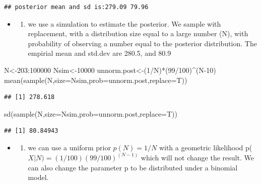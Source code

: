 \documentclass[
]{book}
\newenvironment{Shaded}{\begin{snugshade}}{\end{snugshade}}
\newcommand{\AttributeTok}[1]{\textcolor[rgb]{0.77,0.63,0.00}{#1}}
\newcommand{\DecValTok}[1]{\textcolor[rgb]{0.00,0.00,0.81}{#1}}
\newcommand{\FunctionTok}[1]{\textcolor[rgb]{0.00,0.00,0.00}{#1}}
\newcommand{\NormalTok}[1]{#1}
\newcommand{\OtherTok}[1]{\textcolor[rgb]{0.56,0.35,0.01}{#1}}
\newcommand{\SpecialCharTok}[1]{\textcolor[rgb]{0.00,0.00,0.00}{#1}}
\providecommand{\tightlist}{%
  \setlength{\itemsep}{0pt}\setlength{\parskip}{0pt}}
\theoremstyle{definition}
\theoremstyle{definition}
\theoremstyle{definition}
\theoremstyle{definition}
\theoremstyle{remark}
\begin{document}
\begin{verbatim}
## posterior mean and sd is:279.09 79.96
\end{verbatim}

\begin{itemize}
\item
  \begin{enumerate}
  \def\labelenumi{(\alph{enumi})}
  \setcounter{enumi}{1}
  \tightlist
  \item
    we use a simulation to estimate the posterior. We sample with replacement, with a distribution size equal to a large number (N), with probability of observing a number equal to the posterior distribution. The empirial mean and std.dev are 280.5, and 80.9
  \end{enumerate}
\end{itemize}

\begin{Shaded}
\begin{Highlighting}[]
\NormalTok{ N}\OtherTok{\textless{}{-}}\DecValTok{203}\SpecialCharTok{:}\DecValTok{100000}
\NormalTok{ Nsim}\OtherTok{\textless{}{-}}\DecValTok{10000}
\NormalTok{ unnorm.post}\OtherTok{\textless{}{-}}\NormalTok{(}\DecValTok{1}\SpecialCharTok{/}\NormalTok{N)}\SpecialCharTok{*}\NormalTok{(}\DecValTok{99}\SpecialCharTok{/}\DecValTok{100}\NormalTok{)}\SpecialCharTok{\^{}}\NormalTok{(N}\DecValTok{{-}10}\NormalTok{)}
 \FunctionTok{mean}\NormalTok{(}\FunctionTok{sample}\NormalTok{(N,}\AttributeTok{size=}\NormalTok{Nsim,}\AttributeTok{prob=}\NormalTok{unnorm.post,}\AttributeTok{replace=}\NormalTok{T))}
\end{Highlighting}
\end{Shaded}

\begin{verbatim}
## [1] 278.618
\end{verbatim}

\begin{Shaded}
\begin{Highlighting}[]
 \FunctionTok{sd}\NormalTok{(}\FunctionTok{sample}\NormalTok{(N,}\AttributeTok{size=}\NormalTok{Nsim,}\AttributeTok{prob=}\NormalTok{unnorm.post,}\AttributeTok{replace=}\NormalTok{T))}
\end{Highlighting}
\end{Shaded}

\begin{verbatim}
## [1] 80.84943
\end{verbatim}

\begin{itemize}
\item
  \begin{enumerate}
  \def\labelenumi{(\alph{enumi})}
  \setcounter{enumi}{2}
  \tightlist
  \item
    we can use a uniform prior \(p(N) = 1/N\) with a geometric likelihood p(\(X|N)=(1/100)(99/100)^(N-1)\) which will not change the result. We can also change the parameter p to be distributed under a binomial model.
  \end{enumerate}
\end{itemize}
\end{document}
